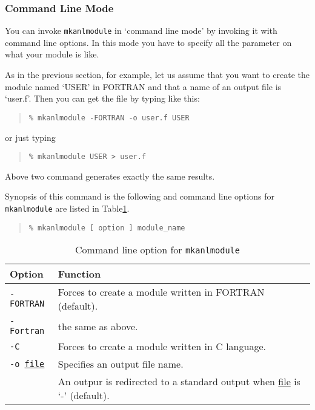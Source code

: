 \subsubsection{Command Line Mode}
You can invoke {\tt mkanlmodule} in `command line mode'
by invoking it with command line options.
In this mode
you have to specify all the parameter on what your module is like.

As in the previous section,
for example,
let us assume that you want to create the module named `USER' in FORTRAN
and that a name of an output file is `user.f'.
Then you can get the file by typing like this:
%
\begin{quote}\baselineskip 3.2mm\begin{verbatim}
% mkanlmodule -FORTRAN -o user.f USER
\end{verbatim}\end{quote}
%
or just typing
%
\begin{quote}\baselineskip 3.2mm\begin{verbatim}
% mkanlmodule USER > user.f
\end{verbatim}\end{quote}
%
Above two command generates exactly the same results.

Synopsis of this command is the following
and command line options for {\tt mkanlmodule} are listed
in Table\ref{tab:mkanlmodule-command-line-option}.

\begin{quote}\baselineskip 3.2mm\begin{verbatim}
% mkanlmodule [ option ] module_name
\end{verbatim}\end{quote}

\begin{table}[hbt]
\begin{tabular}{ll}
\hline
Option & Function \\
\hline
{\tt -FORTRAN} & Forces to create a module written in FORTRAN (default). \\
{\tt -Fortran} & the same as above. \\
{\tt -C}       & Forces to create a module written in C language. \\
{\tt -o \underline{file}} & Specifies an output file name. \\
	& An outpur is redirected to a standard output
	when \underline{file} is `-' (default).\\
\hline
\end{tabular}
\caption{Command line option for {\tt mkanlmodule}}
\label{tab:mkanlmodule-command-line-option}
\end{table}

